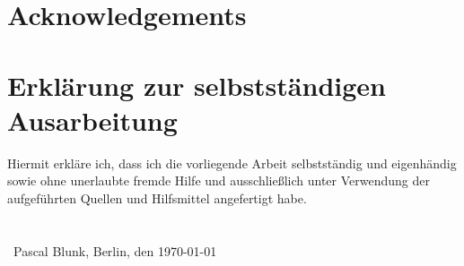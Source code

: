 \section*{Acknowledgements}

\section*{Erklärung zur selbstständigen Ausarbeitung}
Hiermit erkläre ich, dass ich die vorliegende Arbeit selbstständig und eigenhändig sowie ohne unerlaubte fremde Hilfe und ausschließlich unter Verwendung der aufgeführten Quellen und Hilfsmittel angefertigt habe.
\\\\\\\
Pascal Blunk, Berlin, den \today